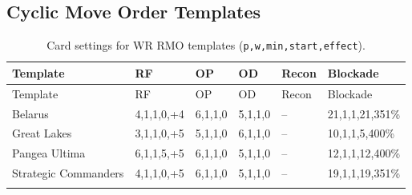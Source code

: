 \subsection{Cyclic Move Order Templates}

\scriptsize
\begin{longtable}{|p{2.8cm}|p{1.5cm}|p{1cm}|p{1cm}|p{1cm}|p{2cm}|}
\hline
\rowcolor{Baby_Blue}
Template & RF & OP & OD & Recon & Blockade \\ \hline\hline
\endfirsthead
\hline
\rowcolor{Baby_Blue}
Template & RF & OP & OD & Recon & Blockade \\ \hline\hline
\endhead
Belarus                & 4,1,1,0,+4  & 6,1,1,0 & 5,1,1,0 & –   & 21,1,1,21,351\% \\ \hline
Great Lakes            & 3,1,1,0,+5  & 5,1,1,0 & 6,1,1,0 & –   & 10,1,1,5,400\%  \\ \hline
Pangea Ultima          & 6,1,1,5,+5  & 6,1,1,0 & 5,1,1,0 & –   & 12,1,1,12,400\% \\ \hline
Strategic Commanders   & 4,1,1,0,+5  & 6,1,1,0 & 5,1,1,0 & –   & 19,1,1,19,351\% \\ \hline
\caption{Card settings for WR RMO templates (\texttt{p,w,min,start,effect}).}
\label{table:wr_cyclic_cards_trimmed}
\end{longtable}
\normalsize